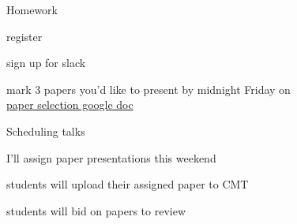 \documentclass[presentation,xcolor={usenames,dvipsnames}]{beamer}
\begin{document}
\begin{frame}{Homework}

\bit
\item register
\item sign up for slack
\item mark 3 papers you'd like to present by midnight Friday on \\
\href{https://docs.google.com/spreadsheets/d/1eSJn0_ANEXfOsZZrYwHoQ6F00FKBLz4olbKVtOLoE40}{paper selection google doc}
\eit

\end{frame}

\begin{frame}{Scheduling talks}

\bit
\item I'll assign paper presentations this weekend
\item students will upload their assigned paper to CMT
\item students will bid on papers to review
\eit

\end{frame}
\end{document}
